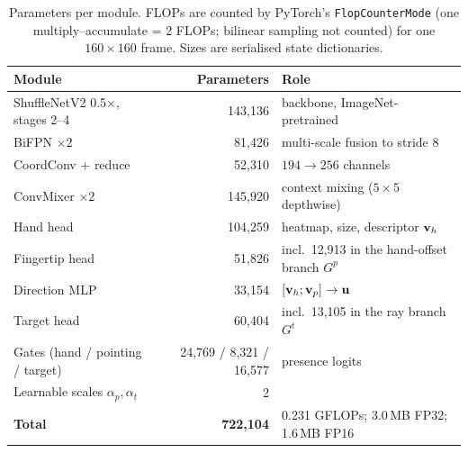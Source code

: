 \begin{table}[t]
  \caption{Parameters per module. FLOPs are counted by PyTorch's \texttt{FlopCounterMode} (one multiply--accumulate = 2 FLOPs; bilinear sampling not counted) for one $160\times160$ frame. Sizes are serialised state dictionaries.}
  \label{tab:params}
  \small
  \begin{tabular}{lrl}
    \toprule
    Module & Parameters & Role \\
    \midrule
    ShuffleNetV2 0.5$\times$, stages 2--4 & 143,136 & backbone, ImageNet-pretrained \\
    BiFPN $\times2$ & 81,426 & multi-scale fusion to stride 8 \\
    CoordConv + reduce & 52,310 & $194\to256$ channels \\
    ConvMixer $\times2$ & 145,920 & context mixing ($5\times5$ depthwise) \\
    \midrule
    Hand head & 104,259 & heatmap, size, descriptor $\mathbf{v}_h$ \\
    Fingertip head & 51,826 & incl.\ 12,913 in the hand-offset branch $G^p$ \\
    Direction MLP & 33,154 & $[\mathbf{v}_h;\mathbf{v}_p]\to\mathbf{u}$ \\
    Target head & 60,404 & incl.\ 13,105 in the ray branch $G^t$ \\
    Gates (hand / pointing / target) & 24,769 / 8,321 / 16,577 & presence logits \\
    Learnable scales $\alpha_p,\alpha_t$ & 2 & \\
    \midrule
    \textbf{Total} & \textbf{722,104} & 0.231 GFLOPs; 3.0\,MB FP32; 1.6\,MB FP16 \\
    \bottomrule
  \end{tabular}
\end{table}

